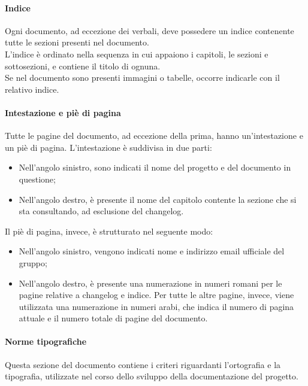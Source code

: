			\paragraph{Indice}
			Ogni documento, ad eccezione dei verbali, deve possedere un indice contenente tutte le sezioni presenti nel documento.\\
			L'indice è ordinato nella sequenza in cui appaiono i capitoli, le sezioni e sottosezioni, e contiene il titolo di ognuna.\\
			Se nel documento sono presenti immagini o tabelle, occorre indicarle con il relativo indice.
			
			\paragraph{Intestazione e piè di pagina}
			Tutte le pagine del documento, ad eccezione della prima, hanno un'intestazione e un piè di pagina. L'intestazione è suddivisa in due parti:
			\begin{itemize}
				\item Nell'angolo sinistro, sono indicati il nome del progetto e del documento in questione;
				\item Nell'angolo destro, è presente il nome del capitolo contente la sezione che si sta consultando, ad esclusione del changelog.
			\end{itemize}
			Il piè di pagina, invece, è strutturato nel seguente modo:
			\begin{itemize}
				\item Nell'angolo sinistro, vengono indicati nome e indirizzo email ufficiale del gruppo;
				\item Nell'angolo destro, è presente una numerazione in numeri romani per le pagine relative a changelog e indice. Per tutte le altre pagine, invece, viene utilizzata una numerazione in numeri arabi, che indica il numero di pagina attuale e il numero totale di pagine del documento.
			\end{itemize} 

			\paragraph{Norme tipografiche}
			Questa sezione del documento contiene i criteri riguardanti l'ortografia e la tipografia, utilizzate nel corso dello sviluppo della documentazione del progetto.

